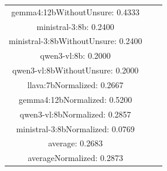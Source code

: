 \documentclass[a4paper]{article}
\begin{document}
\begin{tabular}{ccc}
gemma4:12bWithoutUnsure: 0.4333 \\ ministral-3:8b: 0.2400 \\ ministral-3:8bWithoutUnsure: 0.2400 \\ qwen3-vl:8b: 0.2000 \\ qwen3-vl:8bWithoutUnsure: 0.2000 \\ llava:7bNormalized: 0.2667 \\ gemma4:12bNormalized: 0.5200 \\ qwen3-vl:8bNormalized: 0.2857 \\ ministral-3:8bNormalized: 0.0769 \\ average: 0.2683 \\ averageNormalized: 0.2873 \end{minipage}\\
\end{tabular}

\vspace{5mm}
\end{document}
